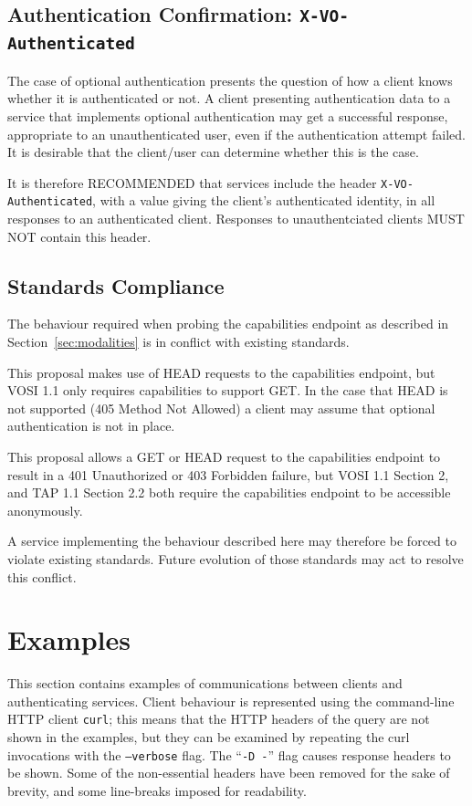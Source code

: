 \documentclass[11pt,a4paper]{ivoa}
\newcommand{\header}[1]{{\tt #1}}
\begin{document}
\subsection{Authentication Confirmation: {\tt X-VO-Authenticated}}

The case of optional authentication presents the question
of how a client knows whether it is authenticated or not.
A client presenting authentication data to a service that implements
optional authentication may get a successful response,
appropriate to an unauthenticated user,
even if the authentication attempt failed.
It is desirable that the client/user can determine whether this is the case.

It is therefore RECOMMENDED that services include the header
\header{X-VO-Authenticated}, with a value giving the client's
authenticated identity, in all responses to an authenticated client.
Responses to unauthentciated clients MUST NOT contain this header.


\subsection{Standards Compliance}

The behaviour required when probing the capabilities endpoint
as described in Section~\ref{sec:modalities}
is in conflict with existing standards.

This proposal makes use of HEAD requests to the capabilities endpoint,
but VOSI 1.1 only requires capabilities to support GET.
In the case that HEAD is not supported (405 Method Not Allowed)
a client may assume that optional authentication is not in place.

This proposal allows a GET or HEAD request to the capabilities endpoint
to result in a 401 Unauthorized or 403 Forbidden failure,
but VOSI 1.1 Section 2, and TAP 1.1 Section 2.2 both require
the capabilities endpoint to be accessible anonymously.

A service implementing the behaviour described here may therefore
be forced to violate existing standards.  Future evolution of those
standards may act to resolve this conflict.


\section{Examples}

This section contains examples of communications between clients
and authenticating services.
Client behaviour is represented using the
command-line HTTP client {\tt curl};
this means that the HTTP headers of the query
are not shown in the examples,
but they can be examined by repeating the curl invocations
with the {\tt --verbose} flag.
The ``{\tt -D -}'' flag causes response headers to be shown.
Some of the non-essential headers have been removed for the sake
of brevity, and some line-breaks imposed for readability.
\end{document}
